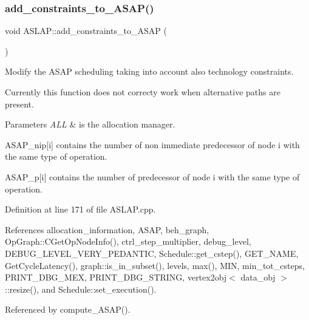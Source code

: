 \subsubsection{\texorpdfstring{add\+\_\+constraints\+\_\+to\+\_\+\+A\+S\+A\+P()}{add\_constraints\_to\_ASAP()}}
{\footnotesize\ttfamily void A\+S\+L\+A\+P\+::add\+\_\+constraints\+\_\+to\+\_\+\+A\+S\+AP (\begin{DoxyParamCaption}{ }\end{DoxyParamCaption})\hspace{0.3cm}{\ttfamily [private]}}



Modify the A\+S\+AP scheduling taking into account also technology constraints. 

Currently this function does not correcty work when alternative paths are present. 
\begin{DoxyParams}{Parameters}
{\em A\+LL} & is the allocation manager. \\
\hline
\end{DoxyParams}
A\+S\+A\+P\+\_\+nip\mbox{[}i\mbox{]} contains the number of non immediate predecessor of node i with the same type of operation.

A\+S\+A\+P\+\_\+p\mbox{[}i\mbox{]} contains the number of predecessor of node i with the same type of operation. 

Definition at line 171 of file A\+S\+L\+A\+P.\+cpp.



References allocation\+\_\+information, A\+S\+AP, beh\+\_\+graph, Op\+Graph\+::\+C\+Get\+Op\+Node\+Info(), ctrl\+\_\+step\+\_\+multiplier, debug\+\_\+level, D\+E\+B\+U\+G\+\_\+\+L\+E\+V\+E\+L\+\_\+\+V\+E\+R\+Y\+\_\+\+P\+E\+D\+A\+N\+T\+IC, Schedule\+::get\+\_\+cstep(), G\+E\+T\+\_\+\+N\+A\+ME, Get\+Cycle\+Latency(), graph\+::is\+\_\+in\+\_\+subset(), levels, max(), M\+IN, min\+\_\+tot\+\_\+csteps, P\+R\+I\+N\+T\+\_\+\+D\+B\+G\+\_\+\+M\+EX, P\+R\+I\+N\+T\+\_\+\+D\+B\+G\+\_\+\+S\+T\+R\+I\+NG, vertex2obj$<$ data\+\_\+obj $>$\+::resize(), and Schedule\+::set\+\_\+execution().



Referenced by compute\+\_\+\+A\+S\+A\+P().

